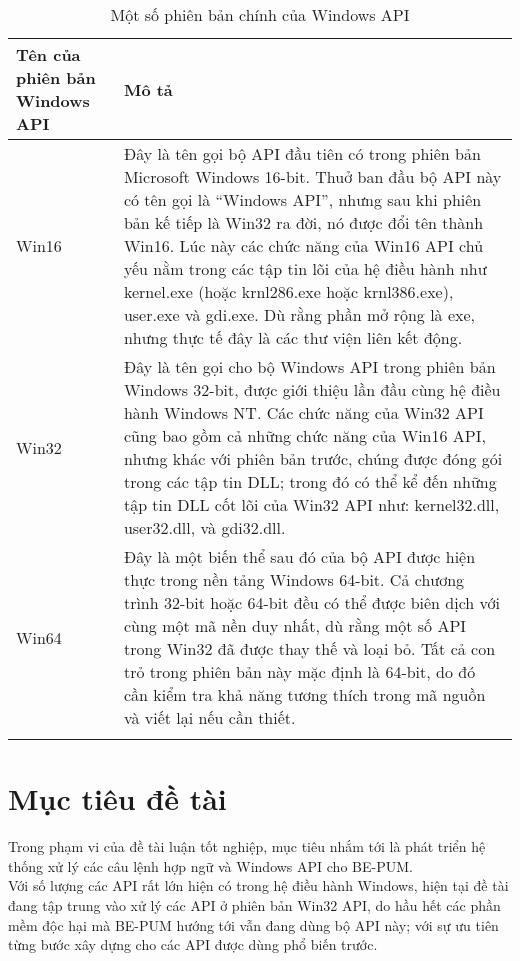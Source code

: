\begin{longtable}{ | m{3cm} | m{11cm} | }
	\hline
Tên của phiên bản Windows API & Mô tả \\
	\hline
	\hline
Win16 & Đây là tên gọi bộ API đầu tiên có trong phiên bản Microsoft Windows 16-bit. Thuở ban đầu bộ API này có tên gọi là “Windows API”, nhưng sau khi phiên bản kế tiếp là Win32 ra đời, nó được đổi tên thành Win16. Lúc này các chức năng của Win16 API chủ yếu nằm trong các tập tin lõi của hệ điều hành như kernel.exe (hoặc krnl286.exe hoặc krnl386.exe), user.exe và gdi.exe. Dù rằng phần mở rộng là exe, nhưng thực tế đây là các thư viện liên kết động. \\
	\hline
Win32 & Đây là tên gọi cho bộ Windows API trong phiên bản Windows 32-bit, được giới thiệu lần đầu cùng hệ điều hành Windows NT. Các chức năng của Win32 API cũng bao gồm cả những chức năng của Win16 API, nhưng khác với phiên bản trước, chúng được đóng gói trong các tập tin DLL; trong đó có thể kể đến những tập tin DLL cốt lõi của Win32 API như: kernel32.dll, user32.dll, và gdi32.dll. \\
	\hline
Win64 & Đây là một biến thể sau đó của bộ API được hiện thực trong nền tảng Windows 64-bit. Cả chương trình 32-bit hoặc 64-bit đều có thể được biên dịch với cùng một mã nền duy nhất, dù rằng một số API trong Win32 đã được thay thế và loại bỏ. Tất cả con trỏ trong phiên bản này mặc định là 64-bit, do đó cần kiểm tra khả năng tương thích trong mã nguồn và viết lại nếu cần thiết. \\
	\hline

\caption[Một số phiên bản chính của Windows API]{Một số phiên bản chính của Windows API}
\label{table:tblwapiver}
\end{longtable}

\section{Mục tiêu đề tài}

Trong phạm vi của đề tài luận tốt nghiệp, mục tiêu nhắm tới là phát triển hệ thống xử lý các câu lệnh hợp ngữ và Windows API cho BE-PUM.\\

Với số lượng các API rất lớn hiện có trong hệ điều hành Windows, hiện tại đề tài đang tập trung vào xử lý các API ở phiên bản Win32 API, do hầu hết các phần mềm độc hại mà BE-PUM hướng tới vẫn đang dùng bộ API này; với sự ưu tiên từng bước xây dựng cho các API được dùng phổ biến trước.\\

